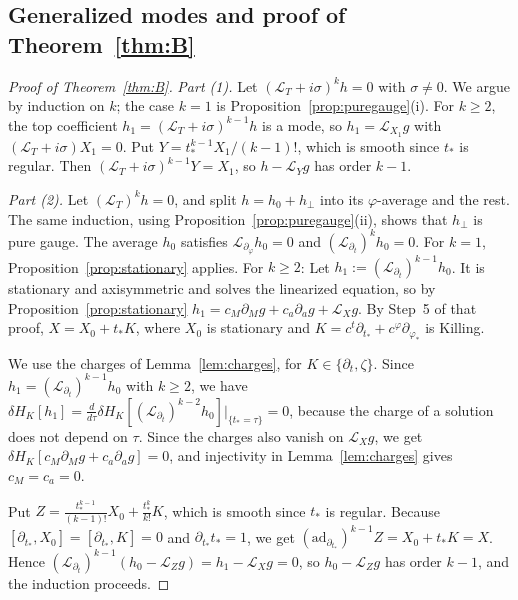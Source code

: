 \documentclass[11pt]{amsart}
\theoremstyle{definition}
\theoremstyle{remark}
\numberwithin{equation}{section}
\newcommand{\cL}{\mathcal{L}}
\begin{document}
\subsection{Generalized modes and proof of Theorem~\ref{thm:B}}
\begin{proof}[Proof of Theorem~\ref{thm:B}]
\emph{Part (1).} Let $(\cL_T+i\sigma)^kh=0$ with $\sigma\ne0$. We argue by induction on $k$; the case $k=1$ is
Proposition~\ref{prop:puregauge}(i). For $k\ge2$, the top coefficient $h_1=(\cL_T+i\sigma)^{k-1}h$ is a mode, so
$h_1=\cL_{X_1}g$ with $(\cL_T+i\sigma)X_1=0$. Put $Y=t_*^{k-1}X_1/(k-1)!$, which is smooth since $t_*$ is regular.
Then $(\cL_T+i\sigma)^{k-1}Y=X_1$, so $h-\cL_Yg$ has order $k-1$.

\emph{Part (2).} Let $(\cL_T)^kh=0$, and split $h=h_0+h_\perp$ into its $\varphi$-average and the rest. The same
induction, using Proposition~\ref{prop:puregauge}(ii), shows that $h_\perp$ is pure gauge. The average $h_0$
satisfies $\cL_{\partial_\varphi}h_0=0$ and $(\cL_{\partial_t})^kh_0=0$. For $k=1$, Proposition~\ref{prop:stationary}
applies. For $k\ge2$:
Let $h_1:=(\cL_{\partial_t})^{k-1}h_0$. It is stationary and axisymmetric and solves the linearized equation, so by
Proposition~\ref{prop:stationary} $h_1=c_M\partial_Mg+c_a\partial_ag+\cL_Xg$. By Step~5 of that proof, $X=X_0+t_*K$, where
$X_0$ is stationary and $K=c^t\partial_{t_*}+c^\varphi\partial_{\varphi_*}$ is Killing.

We use the charges of Lemma~\ref{lem:charges}, for $K\in\{\partial_t,\zeta\}$. Since $h_1=(\cL_{\partial_t})^{k-1}h_0$ with $k\ge2$, we have
$\delta H_K[h_1]=\frac{d}{d\tau}\delta H_K[(\cL_{\partial_t})^{k-2}h_0]|_{\{t_*=\tau\}}=0$, because the charge of a
solution does not depend on $\tau$. Since the charges also vanish on $\cL_Xg$, we get $\delta H_K[c_M\partial_Mg+c_a\partial_ag]=0$, and injectivity in
Lemma~\ref{lem:charges} gives $c_M=c_a=0$.

Put $Z=\frac{t_*^{k-1}}{(k-1)!}X_0+\frac{t_*^{k}}{k!}K$, which is smooth since $t_*$ is regular. Because
$[\partial_{t_*},X_0]=[\partial_{t_*},K]=0$ and $\partial_{t_*}t_*=1$, we get $(\mathrm{ad}_{\partial_{t_*}})^{k-1}Z=X_0+t_*K=X$. Hence
$(\cL_{\partial_t})^{k-1}(h_0-\cL_Zg)=h_1-\cL_Xg=0$, so $h_0-\cL_Zg$ has order $k-1$, and the induction proceeds.
\end{proof}

\appendix
\end{document}
